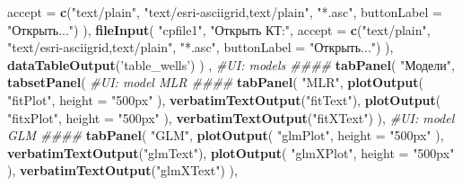 \documentclass[]{article}
\newenvironment{Shaded}{\begin{snugshade}}{\end{snugshade}}
\newcommand{\KeywordTok}[1]{\textcolor[rgb]{0.13,0.29,0.53}{\textbf{#1}}}
\newcommand{\DataTypeTok}[1]{\textcolor[rgb]{0.13,0.29,0.53}{#1}}
\newcommand{\StringTok}[1]{\textcolor[rgb]{0.31,0.60,0.02}{#1}}
\newcommand{\CommentTok}[1]{\textcolor[rgb]{0.56,0.35,0.01}{\textit{#1}}}
\newcommand{\NormalTok}[1]{#1}
\begin{document}
\begin{Shaded}
\begin{Highlighting}[]
            \DataTypeTok{accept =} \KeywordTok{c}\NormalTok{(}\StringTok{"text/plain"}\NormalTok{,}
                       \StringTok{"text/esri-asciigrid,text/plain"}\NormalTok{,}
                       \StringTok{"*.asc"}\NormalTok{,}
                       \DataTypeTok{buttonLabel =} \StringTok{"Открыть..."}\NormalTok{)}
\NormalTok{          ),}
          \KeywordTok{fileInput}\NormalTok{(}
            \StringTok{"cpfile1"}\NormalTok{,}
            \StringTok{"Открыть КТ:"}\NormalTok{,}
            \DataTypeTok{accept =} \KeywordTok{c}\NormalTok{(}\StringTok{"text/plain"}\NormalTok{,}
                       \StringTok{"text/esri-asciigrid,text/plain"}\NormalTok{,}
                       \StringTok{"*.asc"}\NormalTok{,}
                       \DataTypeTok{buttonLabel =} \StringTok{"Открыть..."}\NormalTok{)}
\NormalTok{          ),}
          \KeywordTok{dataTableOutput}\NormalTok{(}\StringTok{'table_wells'}\NormalTok{)}
\NormalTok{        )  ,}
        \CommentTok{#UI: models ####}
        \KeywordTok{tabPanel}\NormalTok{(}
          \StringTok{"Модели"}\NormalTok{,}
          \KeywordTok{tabsetPanel}\NormalTok{(}
            \CommentTok{#UI: model MLR ####}
            \KeywordTok{tabPanel}\NormalTok{(}
              \StringTok{"MLR"}\NormalTok{,}
              \KeywordTok{plotOutput}\NormalTok{(}
                \StringTok{"fitPlot"}\NormalTok{,}
                \DataTypeTok{height =} \StringTok{"500px"}
\NormalTok{              ),}
              \KeywordTok{verbatimTextOutput}\NormalTok{(}\StringTok{"fitText"}\NormalTok{),}
              \KeywordTok{plotOutput}\NormalTok{(}
                \StringTok{"fitxPlot"}\NormalTok{,}
                \DataTypeTok{height =} \StringTok{"500px"}
\NormalTok{              ),}
              \KeywordTok{verbatimTextOutput}\NormalTok{(}\StringTok{"fitXText"}\NormalTok{)}
\NormalTok{            ),}
            \CommentTok{#UI: model GLM ####}
            \KeywordTok{tabPanel}\NormalTok{(}
              \StringTok{"GLM"}\NormalTok{,}
              \KeywordTok{plotOutput}\NormalTok{(}
                \StringTok{"glmPlot"}\NormalTok{,}
                \DataTypeTok{height =} \StringTok{"500px"}
\NormalTok{              ),}
              \KeywordTok{verbatimTextOutput}\NormalTok{(}\StringTok{"glmText"}\NormalTok{),}
              \KeywordTok{plotOutput}\NormalTok{(}
                \StringTok{"glmXPlot"}\NormalTok{,}
                \DataTypeTok{height =} \StringTok{"500px"}
\NormalTok{              ),}
              \KeywordTok{verbatimTextOutput}\NormalTok{(}\StringTok{"glmXText"}\NormalTok{)}
\NormalTok{              ),}

\end{Highlighting}
\end{Shaded}
\end{document}
